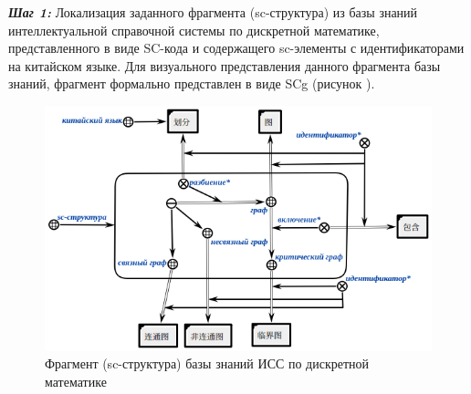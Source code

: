 \textbf{\textit{Шаг 1:}} Локализация заданного фрагмента (sc-структура) из базы знаний интеллектуальной справочной системы по дискретной математике, представленного в виде SC-кода и содержащего sc-элементы с идентификаторами на китайском языке. Для визуального представления данного фрагмента базы знаний, фрагмент формально представлен в виде SCg (рисунок \textit{}).
\begin{figure}[H]
	\centering
	\includegraphics[scale=0.7]{images/part4/chapter_chinese/fragment_knowledge_base.png}
	\caption{Фрагмент (sc-структура) базы знаний ИСС по дискретной математике}
	\label{fig:knowledge-base-fragment}
\end{figure}

